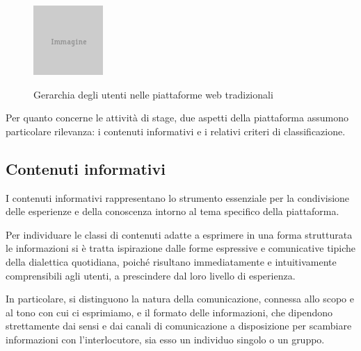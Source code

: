 \begin{figure}[ht]
	\begin{center}
		\includegraphics{placeholder.png}
		\label{fig:tesi:progetto:gerarchia-utenti}
		\caption{Gerarchia degli utenti nelle piattaforme web tradizionali}
	\end{center}
\end{figure}

Per quanto concerne le attività di stage, due aspetti della piattaforma assumono particolare rilevanza: i contenuti informativi e i relativi criteri di classificazione.

\subsection{Contenuti informativi}
\label{sec:tesi:progetto:contenuti}
I contenuti informativi rappresentano lo strumento essenziale per la condivisione delle esperienze e della conoscenza intorno al tema specifico della piattaforma.

Per individuare le classi di contenuti adatte a esprimere in una forma strutturata le informazioni si è tratta ispirazione dalle forme espressive e comunicative tipiche della dialettica quotidiana, poiché risultano immediatamente e intuitivamente comprensibili agli utenti, a prescindere dal loro livello di esperienza.

In particolare, si distinguono la natura della comunicazione, connessa allo scopo e al tono con cui ci esprimiamo, e il formato delle informazioni, che dipendono strettamente dai sensi e dai canali di comunicazione a disposizione per scambiare informazioni con l'interlocutore, sia esso un individuo singolo o un gruppo.

